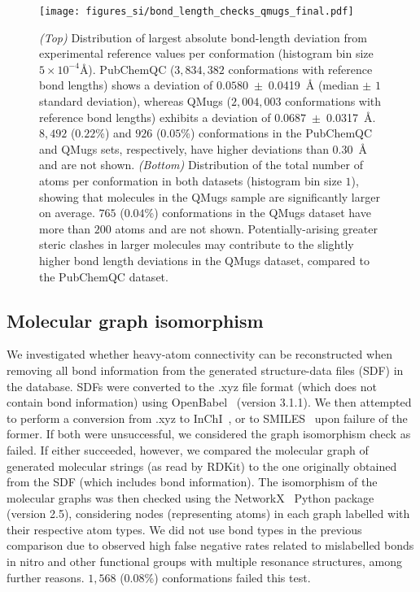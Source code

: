 \begin{figure}[H]
\centering
\texttt{[image: figures\_si/bond\_length\_checks\_qmugs\_final.pdf]}
\caption{
\textit{(Top)} Distribution of largest absolute bond-length deviation from experimental reference values per conformation (histogram bin size $5\times 10^{-4}$\si{\angstrom}). PubChemQC ($3,834,382$ conformations with reference bond lengths) shows a deviation of $0.0580$~$\pm$~\SI{0.0419}{\angstrom} (median $\pm$ $1$ standard deviation), whereas QMugs ($2,004,003$ conformations with reference bond lengths) exhibits a deviation of $0.0687$~$\pm$~\SI{0.0317}{\angstrom}. $8,492$ ($0.22$\%) and $926$ ($0.05$\%) conformations in the PubChemQC and QMugs sets, respectively, have higher deviations than \SI{0.30}{\angstrom} and are not shown. \textit{(Bottom)} Distribution of the total number of atoms per conformation in both datasets (histogram bin size $1$), showing that molecules in the QMugs sample are significantly larger on average. $765$ ($0.04$\%) conformations in the QMugs dataset have more than $200$ atoms and are not shown. Potentially-arising greater steric clashes in larger molecules may contribute to the slightly higher bond length deviations in the QMugs dataset, compared to the PubChemQC dataset.} 
\label{fig:bond_length_histograms}
\end{figure}
\noindent


\subsection{Molecular graph isomorphism}
We investigated whether heavy-atom connectivity can be reconstructed when removing all bond information from the generated structure-data files (SDF) in the database. SDFs were converted to the .xyz file format (which does not contain bond information) using OpenBabel~\cite{o2011open, openbabel} (version 3.1.1). We then attempted to perform a conversion from .xyz to InChI~\cite{heller2015inchi}, or to SMILES~\cite{weininger1988smiles} upon failure of the former. If both were unsuccessful, we considered the graph isomorphism check as failed. If either succeeded, however, we compared the molecular graph of generated molecular strings (as read by RDKit) to the one originally obtained from the SDF (which includes bond information). The isomorphism of the molecular graphs was then checked using the NetworkX~\cite{SciPyProceedings_11} Python package (version 2.5), considering nodes (representing atoms) in each graph labelled with their respective atom types. We did not use bond types in the previous comparison due to observed high false negative rates related to mislabelled bonds in nitro and other functional groups with multiple resonance structures, among further reasons. $1,568$ ($0.08$\%) conformations failed this test. 

